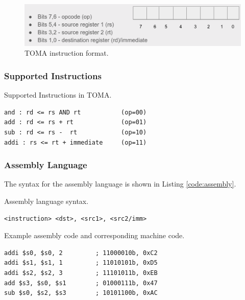 \documentclass[a4paper, 11pt,oneside]{article}
\begin{document}
\begin{figure}[H]
	\begin{center}
	\includegraphics[width=4.5in]{ins_format.png}
	\caption{TOMA instruction format.}
	\label{fig:ins_format} 
	\end{center}
\end{figure}

\subsubsection{Supported Instructions}
\begin{listing}[H]
\caption{Supported Instructions in TOMA.}
\label{code:instructions}
\begin{verbatim}
and : rd <= rs AND rt           (op=00)
add : rd <= rs + rt             (op=01)
sub : rd <= rs -  rt            (op=10)
addi : rs <= rt + immediate     (op=11)
\end{verbatim}
\end{listing}


\subsubsection{Assembly Language}


The syntax for the assembly language is shown in Listing \ref{code:assembly}.

\begin{listing}[H]
\caption{Assembly language syntax.}
\label{code:assembly}
\begin{verbatim}
<instruction> <dst>, <src1>, <src2/imm>
\end{verbatim}
\end{listing}


\begin{listing}[H]
\caption{Example assembly code and corresponding machine code.}
\label{code:assembly_sample}
\begin{verbatim}
addi $s0, $s0, 2         ; 11000010b, 0xC2
addi $s1, $s1, 1         ; 11010101b, 0xD5
addi $s2, $s2, 3         ; 11101011b, 0xEB
add $s3, $s0, $s1        ; 01000111b, 0x47
sub $s0, $s2, $s3        ; 10101100b, 0xAC
\end{verbatim}
\end{listing}
\end{document}
